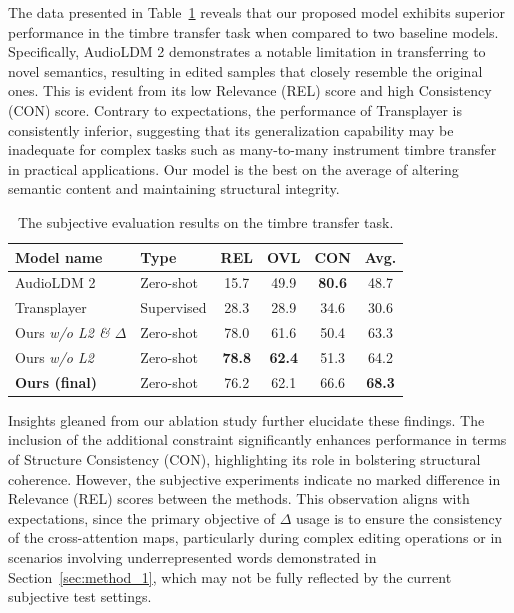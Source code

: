 The data presented in Table~\ref{tab:timbre_sub} reveals that our proposed model exhibits superior performance in the timbre transfer task when compared to two baseline models. Specifically, AudioLDM 2 demonstrates a notable limitation in transferring to novel semantics, resulting in edited samples that closely resemble the original ones. This is evident from its low Relevance (REL) score and high Consistency (CON) score. Contrary to expectations, the performance of Transplayer is consistently inferior, suggesting that its generalization capability may be inadequate for complex tasks such as many-to-many instrument timbre transfer in practical applications. Our model is the best on the average of altering semantic content and maintaining structural integrity. 

\begin{table}[tb]
\small
    \centering
    \begin{tabular}{l|l|ccc|c}
    \toprule
    \textbf{Model name} & \textbf{Type}    &  \textbf{REL}  & \textbf{OVL} & \textbf{CON} & \textbf{Avg.} \\
    \midrule
    AudioLDM 2 &   Zero-shot & 15.7 & 49.9 & \textbf{80.6} & 48.7\\
    Transplayer & Supervised & 28.3 & 28.9 & 34.6 & 30.6\\
    \midrule
    Ours \textit{w/o L2 \& $\Delta$} & Zero-shot & 78.0 & 61.6 & 50.4 & 63.3\\
    Ours \textit{w/o L2} & Zero-shot &\textbf{78.8}&\textbf{62.4}&51.3 & 64.2\\
    \midrule
    \textbf{Ours (final)} & Zero-shot &76.2&62.1&66.6 & \textbf{68.3}\\
    \bottomrule
    \end{tabular}
    \caption{The subjective evaluation results on the timbre transfer task.}
    \label{tab:timbre_sub}
\end{table}

Insights gleaned from our ablation study further elucidate these findings. The inclusion of the additional constraint significantly enhances performance in terms of Structure Consistency (CON), highlighting its role in bolstering structural coherence. However, the subjective experiments indicate no marked difference in Relevance (REL) scores between the methods. This observation aligns with expectations, since the primary objective of $\Delta$ usage is to ensure the consistency of the cross-attention maps, particularly during complex editing operations or in scenarios involving underrepresented words demonstrated in Section~\ref{sec:method_1}, which may not be fully reflected by the current subjective test settings.

